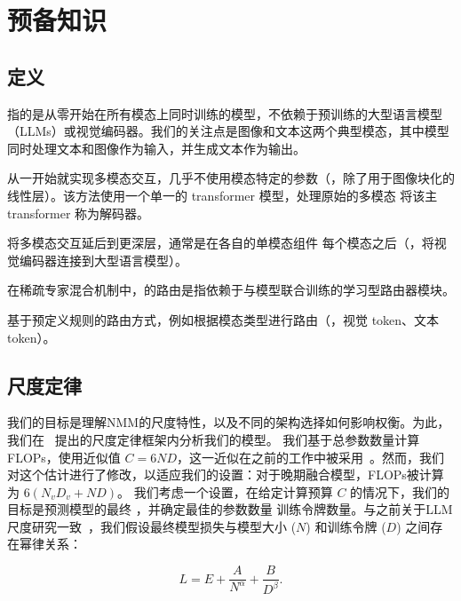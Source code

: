 \section{预备知识}

\subsection{定义}

指的是从零开始在所有模态上同时训练的模型，不依赖于预训练的大型语言模型（LLMs）或视觉编码器。我们的关注点是图像和文本这两个典型模态，其中模型同时处理文本和图像作为输入，并生成文本作为输出。

从一开始就实现多模态交互，几乎不使用模态特定的参数（\eg，除了用于图像块化的线性层）。该方法使用一个单一的 transformer 模型，处理原始的多模态  将该主 transformer 称为解码器。

将多模态交互延后到更深层，通常是在各自的单模态组件 每个模态之后（\eg，将视觉编码器连接到大型语言模型）。

在稀疏专家混合机制中，的路由是指依赖于与模型联合训练的学习型路由器模块。

基于预定义规则的路由方式，例如根据模态类型进行路由（\eg，视觉 token、文本 token）。


\subsection{尺度定律}
我们的目标是理解NMM的尺度特性，以及不同的架构选择如何影响权衡。为此，我们在~\citet{kaplan2020scaling, hoffmann2022training} 提出的尺度定律框架内分析我们的模型。
我们基于总参数数量计算FLOPs，使用近似值 \(C = 6ND\)，这一近似在之前的工作中被采用~\citep{hoffmann2022training, abnar2025parameters}。然而，我们对这个估计进行了修改，以适应我们的设置：对于晚期融合模型，FLOPs被计算为 \(6(N_vD_v + ND)\)。
我们考虑一个设置，在给定计算预算 \(C\) 的情况下，我们的目标是预测模型的最终 ，并确定最佳的参数数量  训练令牌数量。与之前关于LLM尺度研究一致~\citep{hoffmann2022training}，我们假设最终模型损失与模型大小 (\(N\)) 和训练令牌 (\(D\)) 之间存在幂律关系：

\begin{equation}
\label{eq:scaling_laws}
    L = E + \frac{A}{N^{\alpha}} + \frac{B}{D^{\beta}}.
\end{equation}


